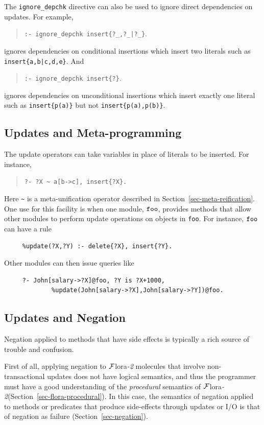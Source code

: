 \documentclass[11pt]{article}
\newcommand{\FLORA}{{\mbox{\sc ${\cal F}${lora}\rm\emph{-2}}}\xspace}
\begin{document}
The {\tt ignore\_depchk} directive can also be used to ignore direct
dependencies on updates. For example, 
\begin{quote}
{\tt :- ignore\_depchk insert\{?\_,?\_|?\_\}}.
\end{quote}
\noindent ignores dependencies on conditional insertions which insert
two literals such as {\tt insert\{a,b|c,d,e\}}. And
\begin{quote}
{\tt :- ignore\_depchk insert\{?\}}.
\end{quote}
\noindent ignores dependencies on unconditional insertions which insert
exactly one literal such as {\tt insert\{p(a)\}} but not {\tt insert\{p(a),p(b)\}}. 

\subsection{Updates and Meta-programming}

The update operators can take variables in place of literals to be
inserted.  For instance,
\begin{quote}
 {\tt ?-  ?X \verb|~| a[b->c], insert\{?X\}.}
\end{quote}
  Here \verb|~| is a meta-unification operator described in
  Section~\ref{sec-meta-reification}.
One use for this facility is when one module, $\tt foo$, provides methods that
allow other modules to perform update operations on objects in {\tt foo}.
For instance, $\tt foo$ can have a rule
\begin{verbatim}
     %update(?X,?Y) :- delete{?X}, insert{?Y}.
\end{verbatim}
Other modules can then issue queries like
\begin{verbatim}
     ?- John[salary->?X]@foo, ?Y is ?X+1000,
             %update(John[salary->?X],John[salary->?Y])@foo.  
\end{verbatim}

\subsection{Updates and Negation}

Negation applied to methods that have side effects is typically a rich source
of trouble and confusion.

First of all, applying negation to \FLORA molecules that involve
non-transactional updates does not have logical semantics, and thus the
programmer must have a good understanding of the \emph{procedural} semantics of
\FLORA (Section~\ref{sec-flora-procedural}).
In this case, the semantics of negation applied to methods or predicates that produce
side-effects through updates  or I/O is that of negation as failure
(Section~\ref{sec-negation}).
\end{document}
